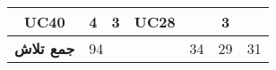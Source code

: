 \documentclass[12pt]{article}
\begin{document}
\begin{longtable}{|c|ccc|l|l|l|}
		UC40                 & \multicolumn{1}{c|}{4}               & \multicolumn{1}{c|}{3}                                                                         & UC28               &                                                                                            & \multicolumn{1}{c|}{3}                                                                        &                                                                                            \\ \hline
		\textbf{جمع تلاش}    & \multicolumn{3}{l|}{94}                                                                                                                                    & 34                                                                                         & 29                                                                                            & 31                                                                                         \\ \hline
	\end{longtable}
	
\end{document}
